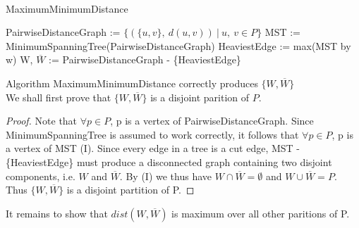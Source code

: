 \documentclass[12pt]{article}
\newenvironment{lemma}[2][Lemma]{\begin{trivlist}
\item[\hskip \labelsep {\bfseries #1}\hskip \labelsep {\bfseries #2.}]}{\end{trivlist}}
\newenvironment{question}[2][Question]{\begin{trivlist}
\item[\hskip \labelsep {\bfseries #1}\hskip \labelsep {\bfseries #2.}]}{\end{trivlist}}
\begin{document}
\begin{question}{3}
  \leavevmode \\
  \begin{algorithm}
    \caption{MaximumMinimumDistance}
    \BlankLine
    PairwiseDistanceGraph := $\{(\{u, v\},\ d(u, v))\ |\ u,\ v \in P\}$\;
    MST := MinimumSpanningTree(PairwiseDistanceGraph)\;
    HeaviestEdge := max(MST by w)\;
    W, $\overline{W}$ := PairwiseDistanceGraph - \{HeaviestEdge\}\;
  \end{algorithm}

  \begin{lemma}{3.1} Algorithm MaximumMinimumDistance correctly produces
    $\{W, \overline{W}\}$ \\

    We shall first prove that $\{W, \overline{W}\}$ is a disjoint parition
    of $P$.
    \begin{proof}
      Note that $\forall p \in P$, p is a vertex of PairwiseDistanceGraph.
      Since MinimumSpanningTree is assumed to work correctly, it follows that
      $\forall p \in P$, p is a vertex of MST (I).  Since every edge in a tree is
      a cut edge, MST - \{HeaviestEdge\} must produce a disconnected graph
      containing two disjoint components, i.e. $W$ and $\overline{W}$.
      By (I) we thus have $W \cap \overline{W} = \emptyset$ and
      $W \cup \overline{W} = P$.  Thus $\{W, \overline{W}\}$ is a disjoint
      partition of P.
    \end{proof}

    It remains to show that $dist(W, \overline{W})$ is maximum over all other
    paritions of P.


\end{lemma}
\end{question}
\end{document}
